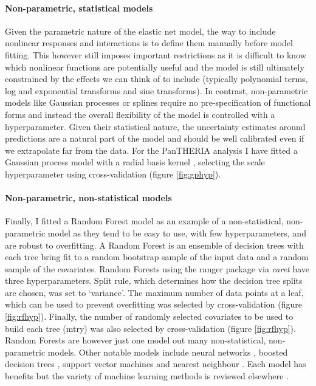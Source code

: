 \documentclass[10pt,]{article}
\let\oldparagraph\paragraph
\renewcommand{\paragraph}[1]{\oldparagraph{#1}\mbox{}}
\begin{document}
\paragraph{Non-parametric, statistical models}\label{non-parametric-statistical-models}

Given the parametric nature of the elastic net model, the way to include nonlinear responses and interactions is to define them manually before model fitting. This however still imposes important restrictions as it is difficult to know which nonlinear functions are potentially useful and the model is still ultimately constrained by the effects we can think of to include (typically polynomial terms, log and exponential transforms and sine transforms). In contrast, non-parametric models like Gaussian processes \citep{rasmussen2004gaussian} or splines \citep{splines} require no pre-specification of functional forms and instead the overall flexibility of the model is controlled with a hyperparameter. Given their statistical nature, the uncertainty estimates around predictions are a natural part of the model and should be well calibrated even if we extrapolate far from the data. For the PanTHERIA analysis I have fitted a Gaussian process model with a radial basis kernel \citep{kernlab}, selecting the scale hyperparameter using cross-validation (figure \ref{fig:gphyp}).

\paragraph{Non-parametric, non-statistical models}\label{non-parametric-non-statistical-models}

Finally, I fitted a Random Forest model \citep{breiman2001random, wright2015ranger} as an example of a non-statistical, non-parametric model as they tend to be easy to use, with few hyperparameters, and are robust to overfitting. A Random Forest is an ensemble of decision trees with each tree bring fit to a random bootstrap sample of the input data and a random sample of the covariates. Random Forests using the ranger \citep{wright2015ranger} package via \emph{caret} have three hyperparameters. Split rule, which determines how the decision tree splits are chosen, was set to `variance'. The maximum number of data points at a leaf, which can be used to prevent overfitting was selected by cross-validation (figure \ref{fig:rfhyp}). Finally, the number of randomly selected covariates to be used to build each tree (mtry) was also selected by cross-validation (figure \ref{fig:rfhyp}). Random Forests are however just one model out many non-statistical, non-parametric models. Other notable models include neural networks \citep{neuralnets}, boosted decision trees \citep{friedman2001greedy}, support vector machines \citep{svm} and nearest neighbour \citep{altman1992introduction}. Each model has benefits but the variety of machine learning methods is reviewed elsewhere \citep{crisci2012review}.
\end{document}
